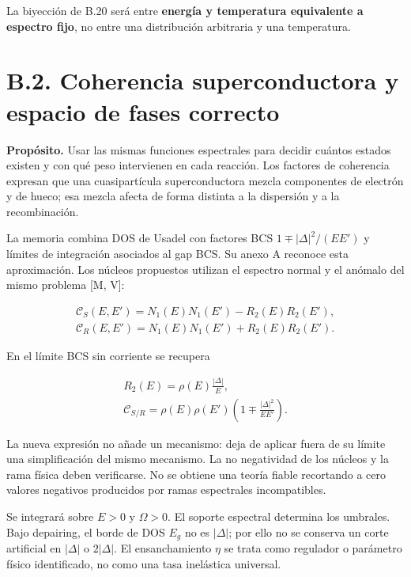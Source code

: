 \documentclass[
  spanish,
  10pt,
  a4paper,
]{article}
\begin{document}
La biyección de B.20 será entre \textbf{energía y temperatura
equivalente a espectro fijo}, no entre una distribución arbitraria y una
temperatura.

\section{B.2. Coherencia superconductora y espacio de fases
correcto}\label{b.2.-coherencia-superconductora-y-espacio-de-fases-correcto}

\textbf{Propósito.} Usar las mismas funciones espectrales para decidir
cuántos estados existen y con qué peso intervienen en cada reacción. Los
factores de coherencia expresan que una cuasipartícula superconductora
mezcla componentes de electrón y de hueco; esa mezcla afecta de forma
distinta a la dispersión y a la recombinación.

La memoria combina DOS de Usadel con factores BCS
\(1\mp |\Delta|^2/(EE')\) y límites de integración asociados al gap BCS.
Su anexo A reconoce esta aproximación. Los núcleos propuestos utilizan
el espectro normal y el anómalo del mismo problema {[}M, V{]}:

\[
\begin{gathered}
\mathcal C_S(E,E')=N_1(E)N_1(E')-R_2(E)R_2(E'),\\
\mathcal C_R(E,E')=N_1(E)N_1(E')+R_2(E)R_2(E').
\end{gathered} \tag{B.1}
\]

En el límite BCS sin corriente se recupera

\[
\begin{gathered}
R_2(E)=\rho(E)\frac{|\Delta|}{E},\\
\mathcal C_{S/R}=\rho(E)\rho(E')\left(1\mp\frac{|\Delta|^2}{EE'}\right).
\end{gathered} \tag{B.2}
\]

La nueva expresión no añade un mecanismo: deja de aplicar fuera de su
límite una simplificación del mismo mecanismo. La no negatividad de los
núcleos y la rama física deben verificarse. No se obtiene una teoría
fiable recortando a cero valores negativos producidos por ramas
espectrales incompatibles.

Se integrará sobre \(E>0\) y \(\Omega>0\). El soporte espectral
determina los umbrales. Bajo depairing, el borde de DOS \(E_g\) no es
\(|\Delta|\); por ello no se conserva un corte artificial en
\(|\Delta|\) o \(2|\Delta|\). El ensanchamiento \(\eta\) se trata como
regulador o parámetro físico identificado, no como una tasa inelástica
universal.
\end{document}
